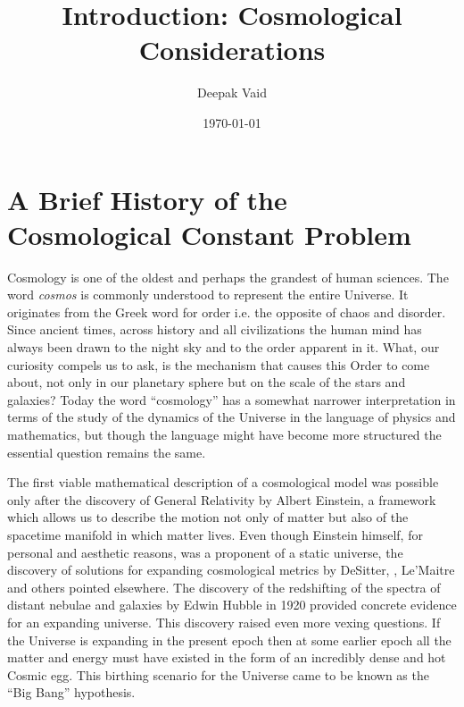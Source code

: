 \documentclass[11pt,english,rmp]{revtex4}
\begin{document}
\title{Introduction: Cosmological Considerations}


\author{Deepak Vaid}


\date{\today}

\maketitle


\tableofcontents{}




\section{A Brief History of the Cosmological Constant Problem}

Cosmology is one of the oldest and perhaps the grandest of human sciences.
The word \emph{cosmos} is commonly understood
to represent the entire Universe. It originates from the Greek word
for order i.e. the opposite of chaos and disorder\cite{Wikipedia2008Cosmology}.
Since ancient times, across history and all civilizations the human
mind has always been drawn to the night sky and to the order apparent
in it. What, our curiosity compels us to ask, is the mechanism that
causes this Order to come about, not only in our planetary sphere
but on the scale of the stars and galaxies? Today the word {}``cosmology''
has a somewhat narrower interpretation in terms of the study of the
dynamics of the Universe in the language of physics and mathematics,
but though the language might have become more structured the essential
question remains the same.

The first viable mathematical description of a cosmological model
was possible only after the discovery of General Relativity by Albert
Einstein\cite{Einstein:1920RelativityBook}, a framework which allows
us to describe the motion not only of matter but also of the spacetime
manifold in which matter lives. Even though Einstein himself, for
personal and aesthetic reasons, was a proponent of a static universe,
the discovery of solutions for expanding cosmological metrics by DeSitter,
     , Le'Maitre and others pointed elsewhere. The discovery of
the redshifting of the spectra of distant nebulae and galaxies by
Edwin Hubble in 1920\cite{Hubble1929Relation} provided concrete evidence
for an expanding universe. This discovery raised even more vexing
questions. If the Universe is expanding in the present epoch then
at some earlier epoch all the matter and energy must have existed
in the form of an incredibly dense and hot Cosmic egg. This birthing
scenario for the Universe came to be known as the {}``Big Bang''
hypothesis.
\end{document}
